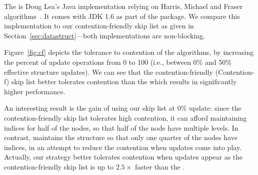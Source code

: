 The  is Doug Lea's Java implementation 
relying on Harris, Michael and Fraser algorithms~\cite{Har01,Mic02,Fra03}.
It comes with JDK 1.6 as part of the  package.
We compare this implementation to our contention-friendly skip list as  given in 
Section~\ref{sec:datastruct}---both implementations are non-blocking.


Figure~\ref{fig:cf} depicts the tolerance to contention of the algorithms, by increasing the percent of 
update operations from 0 to 100 (i.e., between 0\% and 50\% effective structure updates).
We can see that the contention-friendly (Contention-f) skip list better tolerates contention than the 
 which results in significantly higher performance.

An interesting result is the gain of using our skip list at 0\% update: since the contention-friendly
skip list tolerates high contention, it can afford maintaining indices for half of the nodes, so that 
half of the node have multiple levels. In contrast,   maintains the 
structure so that only one quarter of the nodes have indices, in an attempt
to reduce the contention when updates come into play. Actually, our strategy better tolerates
contention when updates appear as the contention-friendly skip list is up 
to $2.5\times$ faster than the .


